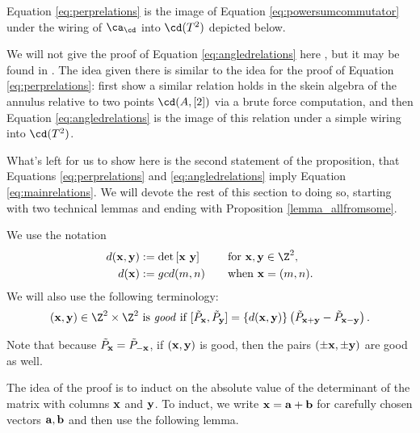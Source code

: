 Equation \eqref{eq:perprelations} is the image of Equation \eqref{eq:powersumcommutator} under the wiring of $\ca_\cd$ into $\cd(T^2)$ depicted below.


We will not give the proof of Equation \eqref{eq:angledrelations} here , but it may be found in . The idea given there is similar to the idea for the proof of Equation \eqref{eq:perprelations}: first show a similar relation holds in the skein algebra of the annulus relative to two points $\cd(A, [2])$ via a brute force computation, and then Equation \eqref{eq:angledrelations} is the image of this relation under a simple wiring into $\cd(T^2)$. 

What's left for us to show here is the second statement of the proposition, that Equations \eqref{eq:perprelations} and \eqref{eq:angledrelations} imply Equation \eqref{eq:mainrelations}. We will devote the rest of this section to doing so, starting with two technical lemmas and ending with Proposition \ref{lemma_allfromsome}. 

We use the notation
\begin{align*} 
d(\xx, \yy) &:= \det\left[\xx\,\, \yy\right] \quad \quad \,\,  \textrm{for } \xx, \yy \in \Z^2, \\
d(\xx) &:= gcd(m,n) \quad \quad \textrm{when } \xx = (m,n).
\end{align*} 
We will also use the following terminology: 
\[
(\xx,\yy) \in \Z^2 \times \Z^2 \textrm{ is \emph{good} if  } [\tilde{P}_\xx,\tilde{P}_\yy] = \{d(\xx,\yy)\} \left( \tilde{P}_{\xx+\yy}-\tilde{P}_{\xx-\yy} \right).
\]

\begin{remark}\label{remark_goodsymmetry}
Note that because $\tilde{P}_{{\mathbf{x}}}=\tilde{P}_{-{\mathbf{x}}}$, if $({\mathbf{x}}, {\mathbf{y}})$ is good, then the pairs $(\pm{\mathbf{x}}, \pm{\mathbf{y}})$ are good as well. 
\end{remark}

The idea of the proof is to induct on the absolute value of the determinant of the matrix with columns ${\mathbf{x}}$ and ${\mathbf{y}}$. To induct, we write ${\mathbf{x}} = {\mathbf{a}} + {\mathbf{b}}$ for carefully chosen vectors ${\mathbf{a}}, {\mathbf{b}}$ and then use the following lemma. 

